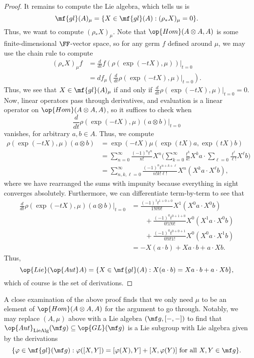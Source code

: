 \documentclass[../notes.tex]{subfiles}
\begin{document}
\begin{proof}
	It remains to compute the Lie algebra, which  tells us is
	\[\mf{gl}(A)_\mu=\{X\in\mf{gl}(A):(\rho_*X)_\mu=0\}.\]
	Thus, we want to compute $(\rho_*X)_\mu$. Note that $\op{Hom}(A\otimes A,A)$ is some finite-dimensional $\FF$-vector space, so for any germ $f$ defined around $\mu$, we may use the chain rule to compute
	\begin{align*}
		(\rho_*X)_\mu f &= \frac d{dt}f(\rho(\exp(-tX),\mu))\bigg|_{t=0} \\
		&= df_\mu\left(\frac d{dt}\rho(\exp(-tX),\mu)\bigg|_{t=0}\right).
	\end{align*}
	Thus, we see that $X\in\mf{gl}(A)_\mu$ if and only if $\frac d{dt}\rho(\exp(-tX),\mu)\big|_{t=0}=0$. Now, linear operators pass through derivatives, and evaluation is a linear operator on $\op{Hom}(A\otimes A,A)$, so it suffices to check when
	\[\frac d{dt}\rho(\exp(-tX),\mu)(a\otimes b)\big|_{t=0}\]
	vanishes, for arbitrary $a,b\in A$. Thus, we compute
	\begin{align*}
		\rho(\exp(-tX),\mu)(a\otimes b) &= \exp(-tX)\mu(\exp(tX)a,\exp(tX)b) \\
		&= \sum_{n=0}^\infty\frac{(-1)^nt^n}{n!}X^n\Bigg(\sum_{k=0}^\infty\frac{t^k}{k!}X^ka\cdot\sum_{\ell=0}\frac{t^\ell}{\ell!}X^\ell b\Bigg) \\
		&= \sum_{n,k,\ell=0}^\infty\frac{(-1)^nt^{n+k+\ell}}{n!k!\ell!}X^n\left(X^ka\cdot X^\ell b\right),
	\end{align*}
	where we have rearranged the sums with impunity because everything in sight converges absolutely. Furthermore, we can differentiate term-by-term to see that
	\begin{align*}
		\frac d{dt}\rho(\exp(-tX),\mu)(a\otimes b)\bigg|_{t=0} &= \frac{(-1)^1t^{1+0+0}}{1!0!0!}X^1\left(X^0a\cdot X^0b\right) \\
		&\qquad+\frac{(-1)^0t^{0+1+0}}{0!1!0!}X^0\left(X^1a\cdot X^0b\right) \\
		&\qquad+\frac{(-1)^0t^{0+0+1}}{0!0!1!}X^0\left(X^0a\cdot X^1b\right) \\
		&= -X(a\cdot b)+Xa\cdot b+a\cdot Xb.
	\end{align*}
	Thus,
	\[\op{Lie}(\op{Aut}A)=\{X\in\mf{gl}(A):X(a\cdot b)=Xa\cdot b+a\cdot Xb\},\]
	which of course is the set of derivations.
\end{proof}
\begin{remark}
	A close examination of the above proof finds that we only need $\mu$ to be an element of $\op{Hom}(A\otimes A,A)$ for the argument to go through. Notably, we may replace $(A,\mu)$ above with a Lie algebra $(\mf g,[-,-])$ to find that $\op{Aut}_{\mathrm{LieAlg}}(\mf g)\subseteq\op{GL}(\mf g)$ is a Lie subgroup with Lie algebra given by the derivations
	\[\{\varphi\in\mf{gl}(\mf g):\varphi([X,Y])=[\varphi(X),Y]+[X,\varphi(Y)]\text{ for all }X,Y\in\mf g\}.\]
\end{remark}
\end{document}
